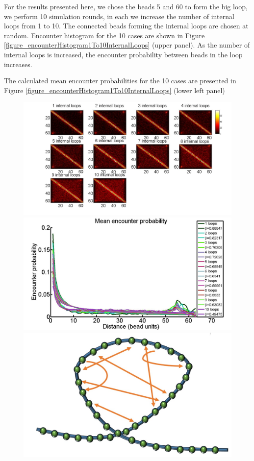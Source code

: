 \documentclass[12pt]{book}
\begin{document}
For the results presented here, we chose the beads 5 and 60 to form the big loop, we perform 10 simulation rounds, in each we increase the number of internal loops from 1 to 10. The connected beads forming the internal loops are chosen at random. Encounter histogram for the 10 cases are shown in Figure \ref{figure_encounterHistogram1To10InternalLoops} (upper panel). As the number of internal loops is increased, the encounter probability between beads in the loop increases.

The calculated mean encounter probabilities  for the 10 cases are presented in Figure \ref{figure_encounterHistogram1To10InternalLoops} (lower left panel)
\begin{figure}[H]
\centering
\includegraphics[scale=0.3]{encounterHistogram1To10InternalLoops}
\includegraphics[scale=0.15]{meanEncounterProbabilityInternalLoops}
\includegraphics[scale=0.2]{polymerModelWithLoopAndInternalConnectors}

\end{figure}
\end{document}
